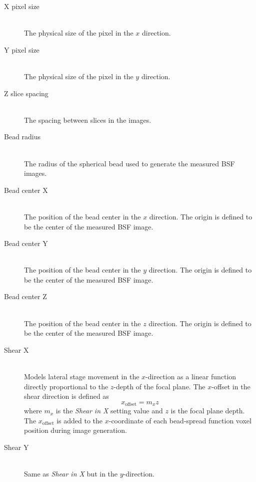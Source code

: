 \documentclass[11pt,titlepage,twoside]{article}
\begin{document}
\begin{description}

  \item[X pixel size] \hfill \\
   The physical size of the pixel in the $x$ direction.
  
  \item[Y pixel size] \hfill \\
   The physical size of the pixel in the $y$ direction.
  
  \item[Z slice spacing] \hfill \\
   The spacing between slices in the images.
  
  \item[Bead radius] \hfill \\
   The radius of the spherical bead used to generate the measured BSF images.
  
  \item[Bead center X] \hfill \\
   The position of the bead center in the $x$ direction. The origin is defined to be the center of the measured BSF image.
  
  \item[Bead center Y] \hfill \\
   The position of the bead center in the $y$ direction. The origin is defined to be the center of the measured BSF image.
  
  \item[Bead center Z] \hfill \\
   The position of the bead center in the $z$ direction. The origin is defined to be the center of the measured BSF image.
    
  \item[Shear X] \hfill \\
Models lateral stage movement in the $x$-direction as a linear function directly proportional to the $z$-depth of the focal plane. The $x$-offset in the shear direction is defined as
\begin{equation}
x_{\mathrm{offset}} = m_{x} z
\end{equation}
where $m_{x}$ is the \emph{Shear in X} setting value and $z$ is the focal plane depth. The $x_{\mathrm{offset}}$ is added to the $x$-coordinate of each bead-spread function voxel position during image generation.

  \item[Shear Y] \hfill \\
   Same as \emph{Shear in X} but in the $y$-direction.


\end{description}
\end{document}
